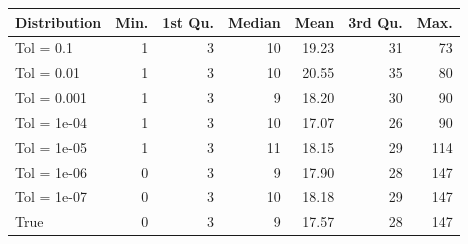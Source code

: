 \begin{figure} 
\begin{tabular}{lrrrrrr}
 Distribution & Min. & 1st Qu. & Median & Mean & 3rd Qu. & Max. \\ 
  \hline
\hline
Tol =  0.1 & 1 & 3 & 10 & 19.23 & 31 & 73 \\ 
  Tol =  0.01 & 1 & 3 & 10 & 20.55 & 35 & 80 \\ 
  Tol =  0.001 & 1 & 3 & 9 & 18.20 & 30 & 90 \\ 
  Tol =  1e-04 & 1 & 3 & 10 & 17.07 & 26 & 90 \\ 
  Tol =  1e-05 & 1 & 3 & 11 & 18.15 & 29 & 114 \\ 
  Tol =  1e-06 & 0 & 3 & 9 & 17.90 & 28 & 147 \\ 
  Tol =  1e-07 & 0 & 3 & 10 & 18.18 & 29 & 147 \\ 
  True & 0 & 3 & 9 & 17.57 & 28 & 147 \\ 
  \end{tabular}
\label{tab:SummaryTable}
\end{figure} 
